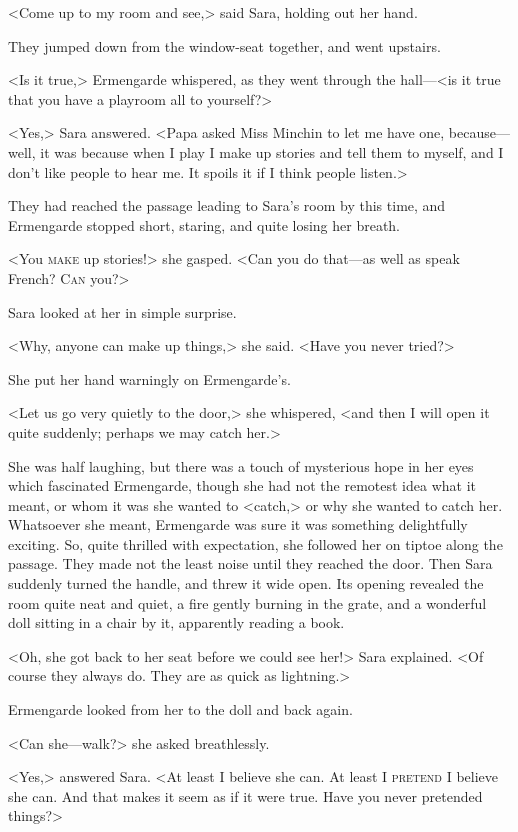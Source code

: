 <Come up to my room and see,> said Sara, holding out her hand.

They jumped down from the window-seat together, and went upstairs.

<Is it true,> Ermengarde whispered, as they went through the hall—<is it true that you have a playroom all to yourself?>

<Yes,> Sara answered. <Papa asked Miss Minchin to let me have one, because—well, it was because when I play I make up stories and tell them to myself, and I don't like people to hear me. It spoils it if I think people listen.>

They had reached the passage leading to Sara's room by this time, and Ermengarde stopped short, staring, and quite losing her breath.

<You \textsc{make} up stories!> she gasped. <Can you do that—as well as speak French? \textsc{Can} you?>

Sara looked at her in simple surprise.

<Why, anyone can make up things,> she said. <Have you never tried?>

She put her hand warningly on Ermengarde's.

<Let us go very quietly to the door,> she whispered, <and then I will open it quite suddenly; perhaps we may catch her.>

She was half laughing, but there was a touch of mysterious hope in her eyes which fascinated Ermengarde, though she had not the remotest idea what it meant, or whom it was she wanted to <catch,> or why she wanted to catch her. Whatsoever she meant, Ermengarde was sure it was something delightfully exciting. So, quite thrilled with expectation, she followed her on tiptoe along the passage. They made not the least noise until they reached the door. Then Sara suddenly turned the handle, and threw it wide open. Its opening revealed the room quite neat and quiet, a fire gently burning in the grate, and a wonderful doll sitting in a chair by it, apparently reading a book.

<Oh, she got back to her seat before we could see her!> Sara explained. <Of course they always do. They are as quick as lightning.>

Ermengarde looked from her to the doll and back again.

<Can she—walk?> she asked breathlessly.

<Yes,> answered Sara. <At least I believe she can. At least I \textsc{pretend} I believe she can. And that makes it seem as if it were true. Have you never pretended things?>

